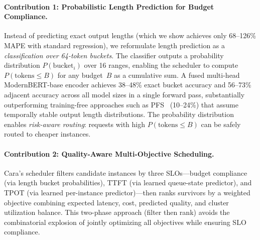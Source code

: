 \documentclass[letterpaper, anonymous, twocolumn, 10pt]{article}
\begin{document}
\paragraph{Contribution 1: Probabilistic Length Prediction for Budget Compliance.}
Instead of predicting exact output lengths (which we show achieves only 68--126\% MAPE with standard regression), we reformulate length prediction as a \emph{classification over 64-token buckets}.
The classifier outputs a probability distribution $P(\text{bucket}_i)$ over 16 ranges, enabling the scheduler to compute $P(\text{tokens} \leq B)$ for any budget~$B$ as a cumulative sum.
A fused multi-head ModernBERT-base encoder achieves 38--48\% exact bucket accuracy and 56--73\% adjacent accuracy across all model sizes in a single forward pass, substantially outperforming training-free approaches such as PFS~\cite{Gong_2025} (10--24\%) that assume temporally stable output length distributions.
The probability distribution enables \emph{risk-aware routing}: requests with high $P(\text{tokens} \leq B)$ can be safely routed to cheaper instances.

\paragraph{Contribution 2: Quality-Aware Multi-Objective Scheduling.}
Cara's scheduler filters candidate instances by three SLOs---budget compliance (via length bucket probabilities), TTFT (via learned queue-state predictor), and TPOT (via learned per-instance predictor)---then ranks survivors by a weighted objective combining expected latency, cost, predicted quality, and cluster utilization balance.
This two-phase approach (filter then rank) avoids the combinatorial explosion of jointly optimizing all objectives while ensuring SLO compliance.
\end{document}
